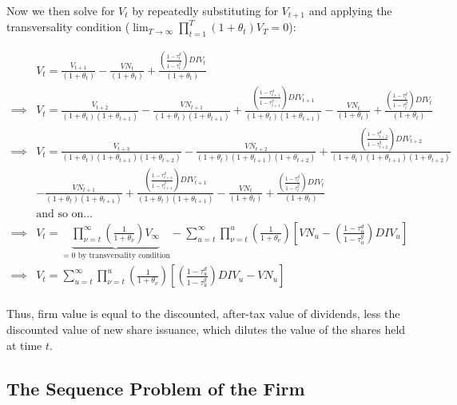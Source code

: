 \noindent\noindent Now we then solve for $V_{t}$ by repeatedly substituting for $V_{t+1}$ and applying the transversality condition ($\lim_{T \to \infty} \prod_{t=1}^{T}(1+\theta_{t})V_{T}=0$):

\begin{equation}
\label{eqn:solve_vs}
\begin{split}
& V_{t}=\frac{V_{t+1}}{(1+\theta_{t})} - \frac{VN_{t}}{(1+\theta_{t})}  + \frac{\left(\frac{1-\tau^{d}_{t}}{1-\tau^{g}_{t}}\right)DIV_{t}}{(1+\theta_{t})} \\
\implies &  V_{t}=\frac{V_{t+2}}{(1+\theta_{t})(1+\theta_{t+1})} - \frac{VN_{t+1}}{(1+\theta_{t})(1+\theta_{t+1})}  + \frac{\left(\frac{1-\tau^{d}_{t+1}}{1-\tau^{g}_{t+1}}\right)DIV_{t+1}}{(1+\theta_{t})(1+\theta_{t+1})} - \frac{VN_{t}}{(1+\theta_{t})}  + \frac{\left(\frac{1-\tau^{d}_{t}}{1-\tau^{g}_{t}}\right)DIV_{t}}{(1+\theta_{t})} \\
\implies &  V_{t}= \frac{V_{t+3}}{(1+\theta_{t})(1+\theta_{t+1})(1+\theta_{t+2})} - \frac{VN_{t+2}}{(1+\theta_{t})(1+\theta_{t+1})(1+\theta_{t+2})}  + \frac{\left(\frac{1-\tau^{d}_{t+2}}{1-\tau^{g}_{t+2}}\right)DIV_{t+2}}{(1+\theta_{t})(1+\theta_{t+1})(1+\theta_{t+2})} \\
& - \frac{VN_{t+1}}{(1+\theta_{t})(1+\theta_{t+1})}  + \frac{\left(\frac{1-\tau^{d}_{t+1}}{1-\tau^{g}_{t+1}}\right)DIV_{t+1}}{(1+\theta_{t})(1+\theta_{t+1})} - \frac{VN_{t}}{(1+\theta_{t})}  + \frac{\left(\frac{1-\tau^{d}_{t}}{1-\tau^{g}_{t}}\right)DIV_{t}}{(1+\theta_{t})} \\
& \text{and so on...} \\
\implies & V_{t}=\underbrace{\prod_{\nu=t}^{\infty}\left(\frac{1}{1+\theta_{\nu}}\right)V_{\infty}}_{=0 \text{ by transversality condition}} - \sum_{u=t}^{\infty} \prod_{\nu=t}^{u}\left(\frac{1}{1+\theta_{\nu}}\right)\left[VN_{u} - \left(\frac{1-\tau^{d}_{u}}{1-\tau^{g}_{u}}\right)DIV_{u}\right]\\
\implies & V_{t}= \sum_{u=t}^{\infty} \prod_{\nu=t}^{u}\left(\frac{1}{1+\theta_{\nu}}\right)\left[ \left(\frac{1-\tau^{d}_{u}}{1-\tau^{g}_{u}}\right)DIV_{u}-VN_{u}\right]\\
\end{split}
\end{equation}

Thus, firm value is equal to the discounted, after-tax value of dividends, less the discounted value of new share issuance, which dilutes the value of the shares held at time $t$. 

\subsection{The Sequence Problem of the Firm}

